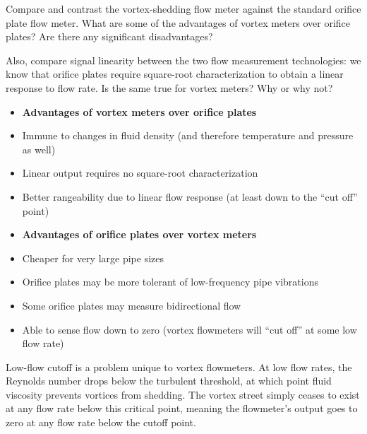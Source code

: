

Compare and contrast the vortex-shedding flow meter against the standard orifice plate flow meter.  What are some of the advantages of vortex meters over orifice plates?  Are there any significant disadvantages?  

Also, compare signal linearity between the two flow measurement technologies: we know that orifice plates require square-root characterization to obtain a linear response to flow rate.  Is the same true for vortex meters?  Why or why not?







\begin{itemize}
\item{} {\bf Advantages of vortex meters over orifice plates}
\item{} Immune to changes in fluid density (and therefore temperature and pressure as well)
\item{} Linear output requires no square-root characterization
\item{} Better rangeability due to linear flow response (at least down to the ``cut off'' point)
\end{itemize}

\begin{itemize}
\item{} {\bf Advantages of orifice plates over vortex meters}
\item{} Cheaper for very large pipe sizes
\item{} Orifice plates may be more tolerant of low-frequency pipe vibrations
\item{} Some orifice plates may measure bidirectional flow
\item{} Able to sense flow down to zero (vortex flowmeters will ``cut off'' at some low flow rate)
\end{itemize}

\vskip 10pt

Low-flow cutoff is a problem unique to vortex flowmeters.  At low flow rates, the Reynolds number drops below the turbulent threshold, at which point fluid viscosity prevents vortices from shedding.  The vortex street simply ceases to exist at any flow rate below this critical point, meaning the flowmeter's output goes to zero at any flow rate below the cutoff point.











